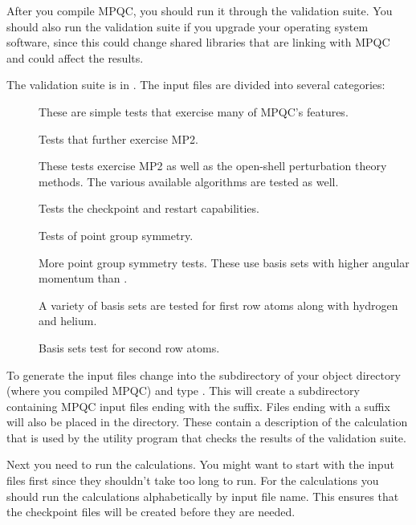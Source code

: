  After you compile MPQC, you should run it through the validation suite.
You should also run the validation suite if you upgrade your operating
system software, since this could change shared libraries that are linking
with MPQC and could affect the results.

 The validation suite is in .  The
input files are divided into several categories:
\begin{description}
  \item[] These are simple tests that exercise many of MPQC's
        features.

  \item[] Tests that further exercise MP2.

  \item[] These tests exercise MP2 as well as the open-shell
        perturbation theory methods.  The various available
        algorithms are tested as well.

  \item[] Tests the checkpoint and restart capabilities.

  \item[] Tests of point group symmetry.

  \item[] More point group symmetry tests.  These use basis
        sets with higher angular momentum than .

  \item[] A variety of basis sets are tested for first row
        atoms along with hydrogen and helium.

  \item[] Basis sets test for second row atoms.

\end{description}

  To generate the input files change into the 
subdirectory of your object directory (where you compiled MPQC) and type
.  This will create a  subdirectory containing
MPQC input files ending with the  suffix.  Files ending with a
 suffix will also be placed in the  directory.
These contain a description of the calculation that is used by the utility
program that checks the results of the validation suite.

  Next you need to run the calculations.  You might want to start with the
 input files first since they shouldn't take too long to run.
For the  calculations you should run the calculations
alphabetically by input file name.  This ensures that the checkpoint files
will be created before they are needed.


